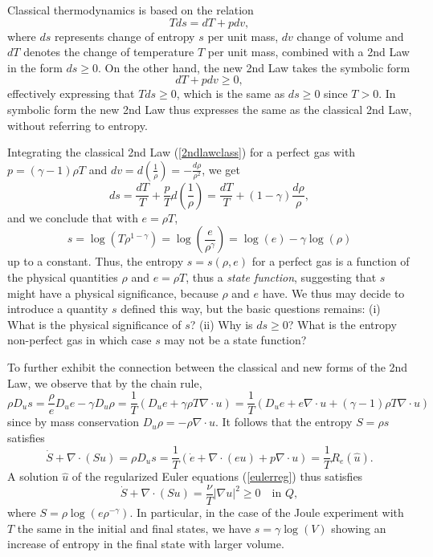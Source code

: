 Classical thermodynamics is based on the relation
\begin{equation}\label{2ndlawclass}
Tds=dT+pdv,
\end{equation}
where $ds$ represents change of entropy $s$ per unit mass, $dv$ change
of volume and $dT$ denotes the change of temperature $T$ per unit mass,
combined with a 2nd Law in the form
$ds\ge 0$. On the other hand, the new 2nd Law takes the symbolic form
\begin{equation}\label{new2ndlawsymb}
dT+pdv\ge 0,
\end{equation}
effectively expressing that $Tds\ge 0$, which is the
same  as $ds\ge 0$ since $T>0$. In symbolic form the new 2nd Law
thus expresses the same as the classical 2nd Law, without referring
to entropy.

Integrating the classical 2nd Law
(\ref{2ndlawclass}) for a perfect gas with
$p=(\gamma -1)\rho T$
and $dv=d(\frac{1}{\rho})=-\frac{d\rho}{\rho^2}$, we get
\[
ds=\frac{dT}{T}+\frac{p}{T}d(\frac{1}{\rho})=
\frac{dT}{T}+(1-\gamma )\frac{d\rho}{\rho},
\]
and we conclude that with $e=\rho T$,
\begin{equation}\label{STrho}
s=\log(T\rho^{1-\gamma})=\log(\frac{e}{\rho^{\gamma}})=
\log(e)-\gamma\log(\rho )
\end{equation}
up to a constant. Thus, the entropy $s=s(\rho ,e )$
for a perfect gas is a function of the physical quantities
$\rho$ and $e=\rho T$, thus a \emph{state function}, suggesting
that $s$ might have a physical significance, because
$\rho$ and $e$ have. We thus may decide to introduce
a quantity $s$ defined this way, but the basic
questions remains: (i) What is the physical significance of $s$?
(ii) Why is $ds\ge 0$? What is the
entropy non-perfect gas in which case $s$ may not be a state function?

To further exhibit the connection between the classical and
new forms of the 2nd Law, we observe that by the chain rule,
\[
\rho D_us=\frac{\rho}{e}D_ue-\gamma D_u\rho=
\frac{1}{T}(D_ue+\gamma \rho T\nabla\cdot u )=
\frac{1}{T}(D_ue+e\nabla\cdot u +(\gamma -1)\rho T\nabla\cdot u)
\]
since by mass conservation $D_u\rho =-\rho\nabla\cdot u$.
It follows that the entropy $S=\rho s$ satisfies
\begin{equation}
\dot S+\nabla\cdot (Su)=\rho D_us=
\frac{1}{T}(\dot e+\nabla\cdot (eu)+p\nabla\cdot u)
=\frac{1}{T}R_e(\hat u).
\end{equation}
A solution $\hat u$ of the regularized Euler equations (\ref{eulerreg})
thus satisfies
\begin{equation}\label{2ndlawS}
\dot S+\nabla\cdot (Su)=
\frac{\nu}{T}\vert\nabla u\vert^2\ge 0 \quad\mbox{in }Q,
\end{equation}
where $S=\rho\log(e\rho^{-\gamma})$. In particular,
in the case of the Joule experiment with $T$ the same
in the initial and final states, we have $s=\gamma\log(V)$ showing
an increase of entropy in the final state with larger volume.

